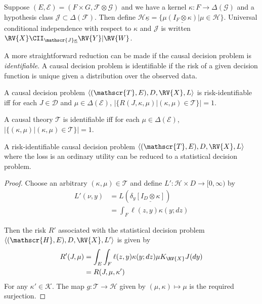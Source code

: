 Suppose $(E,\mathcal{E}) = (F\times G, \mathcal{F}\otimes \mathcal{G})$ and we have a kernel $\kappa:F\to \Delta(\mathcal{G})$ and a hypothesis class $\mathscr{J}\subset\Delta(\mathcal{F})$. Then define $\mathscr{H}\underline{\kappa}=\{\mu\underline{(I_F\otimes \kappa)}|\mu\in \mathscr{H}\}$. Universal conditional independence with respect to $\kappa$ and $\mathscr{J}$ is written $\RV{X}\CII_{\mathscr{J}\underline{\kappa}} \RV{Y} | \RV{W}$.


A more straightforward reduction can be made if the causal decision problem is \emph{identifiable}. A causal decision problem is identifiable if the risk of a given decision function is unique given a distribution over the observed data.

\begin{definition}[Identifiability]
A causal decision problem $\langle (\mathscr{T}, E), D, \RV{X}, L \rangle$ is risk-identifiable iff for each $J\in \mathscr{D}$ and $\mu\in \Delta(\mathcal{E})$, $|\{R(J,\kappa,\mu)|(\kappa,\mu)\in \mathscr{T}\}|=1$.

A causal theory $\mathscr{T}$ is identifiable iff for each $\mu\in \Delta(\mathcal{E})$, $|\{(\kappa,\mu)|(\kappa,\mu)\in\mathscr{T}\}|=1$.
\end{definition}

\begin{theorem}
A risk-identifiable causal decision problem $\langle (\mathscr{T}, E), D, \RV{X}, L \rangle$ where the loss is an ordinary utility can be reduced to a statistical decision problem.
\end{theorem}

\begin{proof}


Choose an arbitrary $(\kappa,\mu)\in\mathscr{T}$ and define $L':\mathscr{H}\times D\to [0,\infty)$ by
\begin{align}
    L'(\nu,y) &= L(\delta_y\underline{[I_D\otimes \kappa]})\\
              &= \int_F \ell(z,y) \kappa(y;dz)
\end{align}

Then the risk $R'$ associated with the statistical decision problem $\langle (\mathscr{H},E),D,\RV{X},L'\rangle$ is given by 
\begin{align}
    R'(J,\mu) &= \int_E \int_F \ell(z,y)  \kappa (y;dz) \mu K_{\RV{X}} J(dy)\\
              &= R(J,\mu,\kappa')
\end{align}
For any $\kappa'\in\mathscr{K}$. The map $g:\mathscr{T}\to\mathscr{H}$ given by $(\mu,\kappa)\mapsto \mu$ is the required surjection.
\end{proof}


